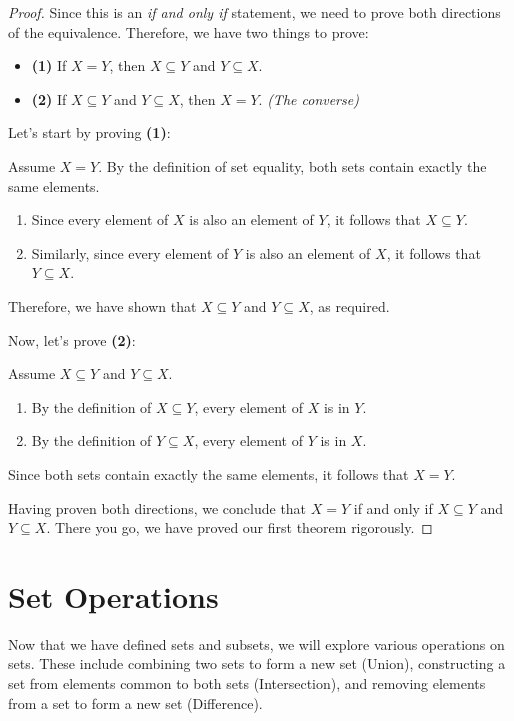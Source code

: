 \begin{proof}
    Since this is an \textit{if and only if} statement, we need to prove both directions of the equivalence. Therefore, we have two things to prove:
    
    \begin{itemize}
        \item \textbf{(1)} If \(X = Y\), then \(X \subseteq Y\) and \(Y \subseteq X\).
        \item \textbf{(2)} If \(X \subseteq Y\) and \(Y \subseteq X\), then \(X = Y\). \textit{(The converse)}
    \end{itemize}
    
    Let’s start by proving \textbf{(1)}:
    
    Assume \(X = Y\). By the definition of set equality, both sets contain exactly the same elements.  
    \begin{enumerate}
        \item Since every element of \(X\) is also an element of \(Y\), it follows that \(X \subseteq Y\).
        \item Similarly, since every element of \(Y\) is also an element of \(X\), it follows that \(Y \subseteq X\).
    \end{enumerate}
    Therefore, we have shown that \(X \subseteq Y\) and \(Y \subseteq X\), as required.
    
    Now, let’s prove \textbf{(2)}:
    
    Assume \(X \subseteq Y\) and \(Y \subseteq X\).  
    \begin{enumerate}
        \item By the definition of \(X \subseteq Y\), every element of \(X\) is in \(Y\).
        \item By the definition of \(Y \subseteq X\), every element of \(Y\) is in \(X\).
    \end{enumerate}
    Since both sets contain exactly the same elements, it follows that \(X = Y\).
    
    Having proven both directions, we conclude that \(X = Y\) if and only if \(X \subseteq Y\) and \(Y \subseteq X\). There you go, we have proved our first theorem rigorously.
\end{proof}

\section{Set Operations}

Now that we have defined sets and subsets, we will explore various operations on sets. These include combining two sets to form a new set (Union), constructing a set from elements common to both sets (Intersection), and removing elements from a set to form a new set (Difference).

